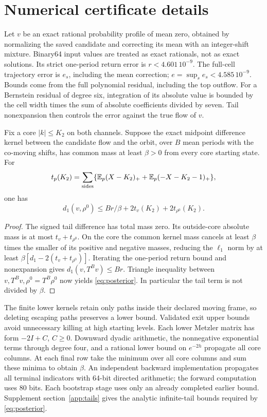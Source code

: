 \section{Numerical certificate details}\label{app:certificate}
Let $v$ be an exact rational probability profile of mean zero, obtained by normalizing the saved candidate and correcting its mean with an integer-shift mixture. Binary64 input values are treated as exact rationals, not as exact solutions. Its strict one-period return error is $r<4.601\,10^{-9}$. The full-cell trajectory error is $e_s$, including the mean correction; $e=\sup_s e_s<4.585\,10^{-9}$. Bounds come from the full polynomial residual, including the top outflow. For a Bernstein residual of degree six, integration of its absolute value is bounded by the cell width times the sum of absolute coefficients divided by seven. Tail nonexpansion then controls the error against the true flow of $v$.

\begin{proposition}\label{prop:posterior}
Fix a core $|k|\le K_2$ on both channels. Suppose the exact midpoint difference kernel between the candidate flow and the orbit, over $B$ mean periods with the co-moving shifts, has common mass at least $\beta>0$ from every core starting state. For
\[
 t_p(K_2)=\sum_{\text{sides}}\{\mathbb E_p(X-K_2)_++\mathbb E_p(-X-K_2-1)_+\},
\]
one has
\begin{equation}\label{eq:posterior}
 d_1(v,\rho^0)\le Br/\beta+2t_v(K_2)+2t_{\rho^0}(K_2).
\end{equation}
\end{proposition}
\begin{proof}
The signed tail difference has total mass zero. Its outside-core absolute mass is at most $t_v+t_{\rho^0}$. On the core the common kernel mass cancels at least $\beta$ times the smaller of its positive and negative masses, reducing the $\ell_1$ norm by at least $\beta[d_1-2(t_v+t_{\rho^0})]$. Iterating the one-period return bound and nonexpansion gives $d_1(v,T^Bv)\le Br$. Triangle inequality between $v,T^Bv,\rho^0=T^B\rho^0$ now yields \eqref{eq:posterior}. In particular the tail term is not divided by $\beta$.
\end{proof}

The finite lower kernels retain only paths inside their declared moving frame, so deleting escaping paths preserves a lower bound. Validated exit upper bounds avoid unnecessary killing at high starting levels. Each lower Metzler matrix has form $-2I+C$, $C\ge0$. Downward dyadic arithmetic, the nonnegative exponential terms through degree four, and a rational lower bound on $e^{-2h}$ propagate all core columns. At each final row take the minimum over all core columns and sum these minima to obtain $\beta$. An independent backward implementation propagates all terminal indicators with 64-bit directed arithmetic; the forward computation uses 80 bits. Each bootstrap stage uses only an already completed earlier bound. Supplement section~\ref{app:tails} gives the analytic infinite-tail bounds required by \eqref{eq:posterior}.


